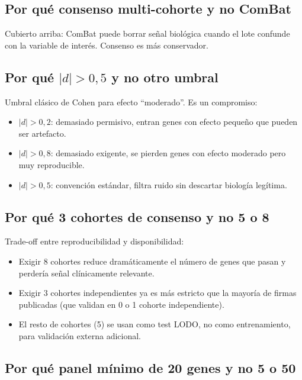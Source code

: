 \documentclass[11pt, a4paper]{article}
\begin{document}
\subsection{Por qu\'e consenso multi-cohorte y no ComBat}

Cubierto arriba: ComBat puede borrar se\~nal biol\'ogica cuando el lote
confunde con la variable de inter\'es. Consenso es m\'as conservador.

\subsection{Por qu\'e $|d| > 0{,}5$ y no otro umbral}

Umbral cl\'asico de Cohen para efecto ``moderado''. Es un compromiso:
\begin{itemize}[leftmargin=1.2em]
  \item $|d| > 0{,}2$: demasiado permisivo, entran genes con efecto
  peque\~no que pueden ser artefacto.
  \item $|d| > 0{,}8$: demasiado exigente, se pierden genes con efecto
  moderado pero muy reproducible.
  \item $|d| > 0{,}5$: convenci\'on est\'andar, filtra ruido sin
  descartar biolog\'ia leg\'itima.
\end{itemize}

\subsection{Por qu\'e 3 cohortes de consenso y no 5 o 8}

Trade-off entre reproducibilidad y disponibilidad:

\begin{itemize}[leftmargin=1.2em]
  \item Exigir 8 cohortes reduce dram\'aticamente el n\'umero de genes
  que pasan y perder\'ia se\~nal cl\'inicamente relevante.
  \item Exigir 3 cohortes independientes ya es m\'as estricto que la
  mayor\'ia de firmas publicadas (que validan en 0 o 1 cohorte
  independiente).
  \item El resto de cohortes (5) se usan como test LODO, no como
  entrenamiento, para validaci\'on externa adicional.
\end{itemize}

\subsection{Por qu\'e panel m\'inimo de 20 genes y no 5 o 50}
\end{document}
